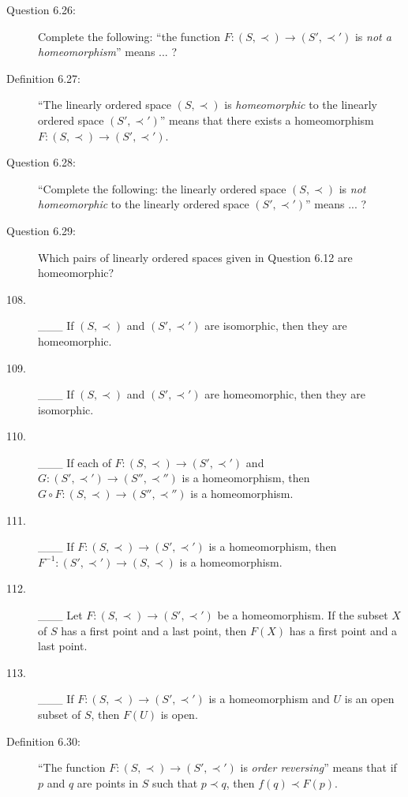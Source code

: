 \documentclass{book}
\begin{document}
\begin{description}
\item[Question 6.26:] Complete the following: ``the function $F:(S, \prec) \rightarrow (S', \prec ')$ is \emph{not a homeomorphism}'' means ... ?

\item[Definition 6.27:] ``The linearly ordered space $(S, \prec)$ is \emph{homeomorphic} to the linearly ordered space $(S', \prec ')$'' means that there exists a homeomorphism $F: (S, \prec) \rightarrow (S', \prec ')$.

\item[Question 6.28:] ``Complete the following: the linearly ordered space $(S, \prec)$ is \emph{not homeomorphic} to the linearly ordered space $(S', \prec ')$'' means ... ?

\item[Question 6.29:] Which pairs of linearly ordered spaces given in Question 6.12 are homeomorphic?

\item[108.] \_\_\_ If $(S, \prec)$ and $(S', \prec ')$ are isomorphic, then they are homeomorphic.

\item[109.] \_\_\_ If $(S, \prec)$ and $(S', \prec ')$ are homeomorphic, then they are isomorphic.

\item[110.] \_\_\_ If each of $F: (S, \prec) \rightarrow (S', \prec ')$ and $G: (S', \prec ') \rightarrow (S'', \prec '')$ is a homeomorphism, then $G \circ F: (S, \prec) \rightarrow (S'', \prec '')$ is a homeomorphism.

\item[111.] \_\_\_ If $F: (S, \prec) \rightarrow (S', \prec ')$ is a homeomorphism, then $F^{-1}: (S', \prec ') \rightarrow (S, \prec)$ is a homeomorphism.

\item[112.] \_\_\_ Let $F: (S, \prec) \rightarrow (S', \prec ')$ be a homeomorphism. If the subset $X$ of $S$ has a first point and a last point, then $F(X)$ has a first point and a last point.

\item[113.] \_\_\_ If $F: (S, \prec) \rightarrow (S', \prec ')$ is a homeomorphism and $U$ is an open subset of $S$, then $F(U)$ is open.

\item[Definition 6.30:] ``The function $F: (S, \prec) \rightarrow (S', \prec ')$ is \emph{order reversing}'' means that if $p$ and $q$ are points in $S$ such that $p \prec q$, then $f(q) \prec F(p)$.


\end{description}
\end{document}
